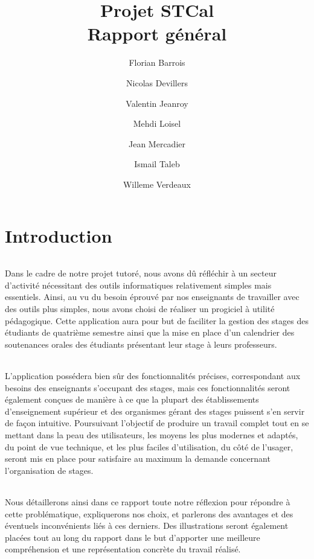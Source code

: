 \documentclass[a4paper,10pt]{report}
\date{}
\title{\Huge{Projet STCal}\\ {\Large Rapport général}}
\author{Florian Barrois \and Nicolas Devillers \and Valentin Jeanroy \and Mehdi Loisel \and Jean Mercadier \and Ismail Taleb \and Willeme Verdeaux}
\begin{document}
\maketitle
\strut
\renewcommand{\contentsname}{Sommaire}
\tableofcontents

\part{Introduction}
  \paragraph{}
    Dans le cadre de notre projet tutoré, nous avons dû réfléchir à un secteur d'activité nécessitant des outils informatiques relativement simples mais essentiels. 
    Ainsi, au vu du besoin éprouvé par nos enseignants de travailler avec des outils plus simples, nous avons choisi de réaliser un progiciel à utilité pédagogique.
    Cette application aura pour but de faciliter la gestion des stages des étudiants de quatrième semestre ainsi que la mise en place d'un calendrier des soutenances orales des étudiants présentant leur stage à leurs professeurs.

  \paragraph{}
    L'application possédera bien sûr des fonctionnalités précises, correspondant aux besoins des enseignants s'occupant des stages, mais ces fonctionnalités seront également conçues de manière à ce que la plupart des établissements d'enseignement supérieur et des organismes gérant des stages puissent s'en servir de façon intuitive. 
    Poursuivant l'objectif de produire un travail complet tout en se mettant dans la peau des utilisateurs, les moyens les plus modernes et adaptés, du point de vue technique, et les plus faciles d'utilisation, du côté de l'usager, seront mis en place pour satisfaire au maximum la demande concernant l'organisation de stages. 

  \paragraph{}
    Nous détaillerons ainsi dans ce rapport toute notre réflexion pour répondre à cette problématique, expliquerons nos choix, et parlerons des avantages et des éventuels inconvénients liés à ces derniers.  
    Des illustrations seront également placées tout au long du rapport dans le but d'apporter une meilleure compréhension et une représentation concrète du travail réalisé.
\end{document}
